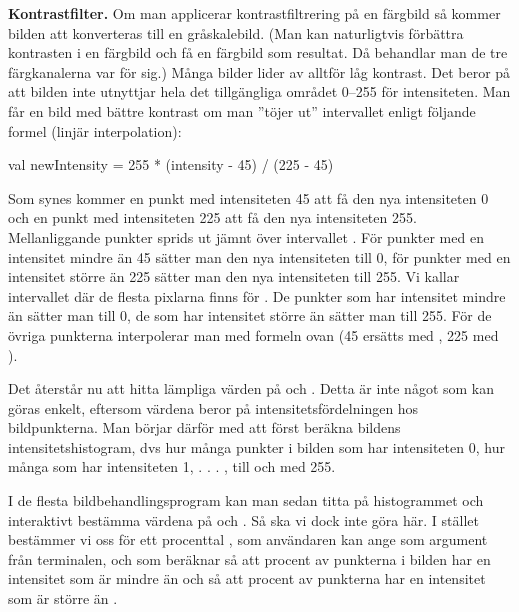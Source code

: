 \Task \textbf{Kontrastfilter.} Om man applicerar kontrastfiltrering på en färgbild så kommer bilden att konverteras till en gråskalebild. (Man kan naturligtvis förbättra kontrasten i en färgbild och få en färgbild som resultat. Då behandlar man de tre färgkanalerna var för sig.) Många bilder lider av alltför låg kontrast. Det beror på att bilden inte utnyttjar hela det tillgängliga området 0–255 för intensiteten. Man får en bild med bättre kontrast om man ''töjer ut'' intervallet enligt följande formel (linjär interpolation):

\begin{Code}
val newIntensity = 255 * (intensity - 45) / (225 - 45)
\end{Code}

Som synes kommer en punkt med intensiteten 45 att få den nya intensiteten 0 och en punkt med intensiteten 225 att få den nya intensiteten 255. Mellanliggande punkter sprids ut jämnt över intervallet \code{[0, 255]}. För punkter med en intensitet mindre än 45 sätter man den nya intensiteten till 0, för punkter med en intensitet större än 225 sätter man den nya intensiteten till 255. Vi kallar intervallet där de flesta pixlarna finns för . De punkter som har intensitet mindre än  sätter man till 0, de som har intensitet större än  sätter man till 255. För de övriga punkterna interpolerar man med formeln ovan (45 ersätts med , 225 med ).

Det återstår nu att hitta lämpliga värden på  och . Detta är inte något som kan göras enkelt, eftersom värdena beror på intensitetsfördelningen hos bildpunkterna. Man börjar därför med att först beräkna bildens intensitetshistogram, dvs hur många punkter i bilden som har intensiteten 0, hur många som har intensiteten 1, . . . , till och med 255.

I de flesta bildbehandlingsprogram kan man sedan titta på histogrammet och interaktivt bestämma värdena på  och . Så ska vi dock inte göra här. I stället bestämmer vi oss för ett procenttal , som användaren kan ange som argument från terminalen, och som  beräknar  så att  procent av punkterna i bilden har en intensitet som är mindre än  och  så att  procent av punkterna har en intensitet som är större än .

\vspace{1em}

